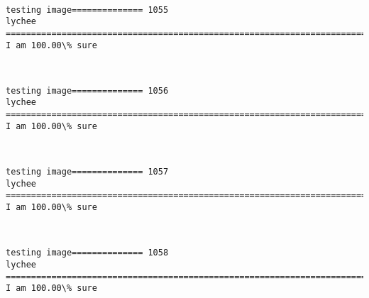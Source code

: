 \documentclass[11pt]{article}
\begin{document}
    \begin{center}
    \end{center}
    { \hspace*{\fill} \\}
    
    \begin{Verbatim}[commandchars=\\\{\}]
testing image============== 1055
lychee
============================================================================
I am 100.00\% sure

    \end{Verbatim}

    \begin{center}
    \end{center}
    { \hspace*{\fill} \\}
    
    \begin{Verbatim}[commandchars=\\\{\}]
testing image============== 1056
lychee
============================================================================
I am 100.00\% sure

    \end{Verbatim}

    \begin{center}
    \end{center}
    { \hspace*{\fill} \\}
    
    \begin{Verbatim}[commandchars=\\\{\}]
testing image============== 1057
lychee
============================================================================
I am 100.00\% sure

    \end{Verbatim}

    \begin{center}
    \end{center}
    { \hspace*{\fill} \\}
    
    \begin{Verbatim}[commandchars=\\\{\}]
testing image============== 1058
lychee
============================================================================
I am 100.00\% sure

    \end{Verbatim}
\end{document}
